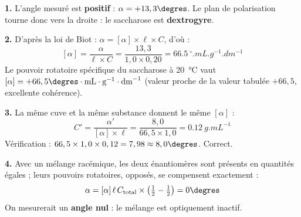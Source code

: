 \documentclass[11pt]{article}
\providecommand{\degree}{^{\circ}}
\begin{document}
\begin{corrige}
\textbf{1.} L'angle mesuré est \textbf{positif} : $\alpha = +13,3\degres$. Le plan de polarisation tourne donc vers la droite : le saccharose est \textbf{dextrogyre}.

\textbf{2.} D'après la loi de Biot : $\alpha = [\alpha] \times \ell \times C$, d'où :
\[ [\alpha] = \frac{\alpha}{\ell \times C} = \frac{13,3}{1,0 \times 0,20} = \SI{66,5}{\degree.mL.g^{-1}.dm^{-1}} \]
Le pouvoir rotatoire spécifique du saccharose à \SI{20}{\celsius} vaut $[\alpha] = +66,5\degres\cdot\text{mL}\cdot\text{g}^{-1}\cdot\text{dm}^{-1}$ (valeur proche de la valeur tabulée $+66,5$, excellente cohérence).

\textbf{3.} La même cuve et la même substance donnent le même $[\alpha]$ :
\[ C' = \frac{\alpha'}{[\alpha] \times \ell} = \frac{8,0}{66,5 \times 1,0} = \SI{0,12}{g.mL^{-1}} \]
Vérification : $66,5 \times 1,0 \times 0,12 = 7,98 \approx 8,0\degres$. Correct.

\textbf{4.} Avec un mélange racémique, les deux énantiomères sont présents en quantités égales ; leurs pouvoirs rotatoires, opposés, se compensent exactement :
\[ \alpha = [\alpha]\,\ell\,C_{\text{total}} \times \left(\tfrac{1}{2} - \tfrac{1}{2}\right) = 0\degres \]
On mesurerait un \textbf{angle nul} : le mélange est optiquement inactif.
\end{corrige}
\end{document}

